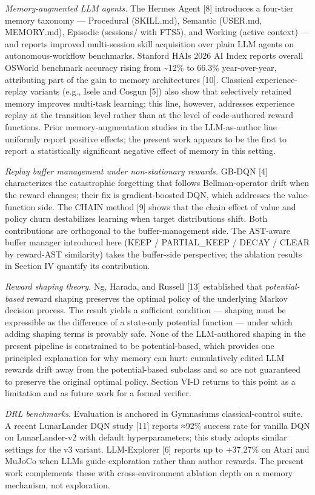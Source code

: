 \emph{Memory-augmented LLM agents.} The Hermes Agent {[}8{]} introduces a four-tier memory taxonomy --- Procedural (SKILL.md), Semantic (USER.md, MEMORY.md), Episodic (sessions/ with FTS5), and Working (active context) --- and reports improved multi-session skill acquisition over plain LLM agents on autonomous-workflow benchmarks. Stanford HAI\textquotesingle s 2026 AI Index reports overall OSWorld benchmark accuracy rising from \textasciitilde12\% to 66.3\% year-over-year, attributing part of the gain to memory architectures {[}10{]}. Classical experience-replay variants (e.g., Isele and Cosgun {[}5{]}) also show that selectively retained memory improves multi-task learning; this line, however, addresses experience replay at the transition level rather than at the level of code-authored reward functions. Prior memory-augmentation studies in the LLM-as-author line uniformly report positive effects; the present work appears to be the first to report a statistically significant negative effect of memory in this setting.

\emph{Replay buffer management under non-stationary rewards.} GB-DQN {[}4{]} characterizes the catastrophic forgetting that follows Bellman-operator drift when the reward changes; their fix is gradient-boosted DQN, which addresses the value-function side. The CHAIN method {[}9{]} shows that the chain effect of value and policy churn destabilizes learning when target distributions shift. Both contributions are orthogonal to the buffer-management side. The AST-aware buffer manager introduced here (KEEP / PARTIAL\_KEEP / DECAY / CLEAR by reward-AST similarity) takes the buffer-side perspective; the ablation results in Section IV quantify its contribution.

\emph{Reward shaping theory.} Ng, Harada, and Russell {[}13{]} established that \emph{potential-based} reward shaping preserves the optimal policy of the underlying Markov decision process. The result yields a sufficient condition --- shaping must be expressible as the difference of a state-only potential function --- under which adding shaping terms is provably safe. None of the LLM-authored shaping in the present pipeline is constrained to be potential-based, which provides one principled explanation for why memory can hurt: cumulatively edited LLM rewards drift away from the potential-based subclass and so are not guaranteed to preserve the original optimal policy. Section VI-D returns to this point as a limitation and as future work for a formal verifier.

\emph{DRL benchmarks.} Evaluation is anchored in Gymnasium\textquotesingle s classical-control suite. A recent LunarLander DQN study {[}11{]} reports ≈92\% success rate for vanilla DQN on LunarLander-v2 with default hyperparameters; this study adopts similar settings for the v3 variant. LLM-Explorer {[}6{]} reports up to +37.27\% on Atari and MuJoCo when LLMs guide exploration rather than author rewards. The present work complements these with cross-environment ablation depth on a memory mechanism, not exploration.

